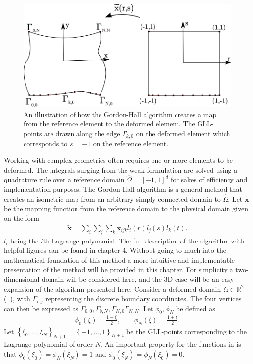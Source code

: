 %
\begin{figure}[h]
	\centering
	\includegraphics[width=1.0\textwidth]{Figures/GordonHall5.png}
	\caption{An illustration of how the Gordon-Hall algorithm creates a map from the 
    reference element to the deformed element. The GLL-points are drawn along the edge
    $\Gamma_{k,0}$ on the deformed element which corresponds to $s=-1$ on the reference
    element.}
	\label{fig:GH}
\end{figure}
%

Working with complex geometries often requires one or more elements to be deformed.
The integrals surging from the weak formulation are solved using a quadrature rule over 
a reference domain $\hat{\Omega} = [-1,1]^d$ for sakes of efficiency and implementation purposes. The Gordon-Hall 
algorithm is a general method that creates an isometric map from an arbitrary simply connected domain to $\hat{\Omega}$.
Let $\mathbf{\tilde{x}}$ be the mapping function from the reference domain to the physical domain given on the form 
%
\begin{align}
    \mathbf{\tilde{x}}= \sum_i \sum_j \sum_k \mathbf{x}_{ijk}l_i(r) l_j(s) l_k(t).
    \label{eq:mapping}
\end{align}
%
$l_i$ being the $i$th Lagrange polynomial.
The full description of the algorithm with helpful figures can be found in \cite{Deville} chapter 4.
Without going to much into the mathematical foundation of this method a more intuitive and implementable
presentation of the method will be provided in this chapter. 
For simplicity a two-dimensional domain will be considered here, and the 3D case will be an easy expansion 
of the algorithm presented here. Consider a deformed domain $\Omega \in \mathbb{R}^2$ (~), with $\Gamma_{i,j}$ representing 
the discrete boundary coordinates. The four vertices can then be expressed as 
$\Gamma_{0,0},\Gamma_{0,N},\Gamma_{N,0}\Gamma_{N,N}$. Let $\phi_0,\phi_N$ be defined as 
%
\begin{align}
    \phi_0(\xi) = \frac{1-\xi}{2}, \qquad
    \phi_N(\xi) = \frac{1+\xi}{2}.
    \label{eq:interpolationoperator}
\end{align}
%
Let $\left\{ \xi_0, \ldots ,\xi_N \right\}_{N+1} = \left\{ -1 ,\ldots ,1 \right\}_{N+1}$
be the GLL-points corresponding to the Lagrange polynomial of order $N$. 
An important property for the functions in  is that
$\phi_0(\xi_0) =\phi_N(\xi_N) = 1$ and $\phi_0(\xi_N) =\phi_N(\xi_0) = 0$.

